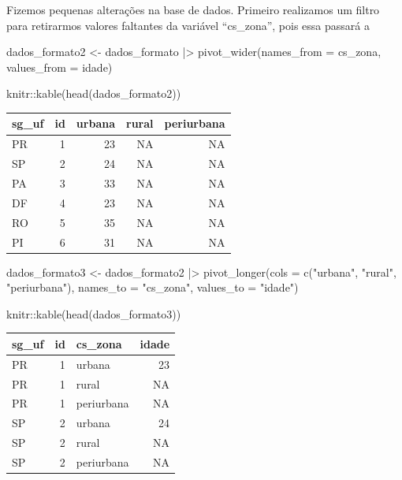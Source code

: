 \documentclass[
  letterpaper,
  DIV=11,
  numbers=noendperiod]{scrreprt}
\newenvironment{Shaded}{\begin{snugshade}}{\end{snugshade}}
\newcommand{\AttributeTok}[1]{\textcolor[rgb]{0.40,0.45,0.13}{#1}}
\newcommand{\FunctionTok}[1]{\textcolor[rgb]{0.28,0.35,0.67}{#1}}
\newcommand{\NormalTok}[1]{\textcolor[rgb]{0.00,0.23,0.31}{#1}}
\newcommand{\OtherTok}[1]{\textcolor[rgb]{0.00,0.23,0.31}{#1}}
\newcommand{\SpecialCharTok}[1]{\textcolor[rgb]{0.37,0.37,0.37}{#1}}
\newcommand{\StringTok}[1]{\textcolor[rgb]{0.13,0.47,0.30}{#1}}
\begin{document}
Fizemos pequenas alterações na base de dados. Primeiro realizamos um
filtro para retirarmos valores faltantes da variável ``cs\_zona'', pois
essa passará a

\begin{Shaded}
\begin{Highlighting}[]
\NormalTok{dados\_formato2 }\OtherTok{\textless{}{-}}\NormalTok{ dados\_formato }\SpecialCharTok{|\textgreater{}} 
  \FunctionTok{pivot\_wider}\NormalTok{(}\AttributeTok{names\_from =}\NormalTok{ cs\_zona, }\AttributeTok{values\_from =}\NormalTok{ idade)  }

\NormalTok{knitr}\SpecialCharTok{::}\FunctionTok{kable}\NormalTok{(}\FunctionTok{head}\NormalTok{(dados\_formato2))}
\end{Highlighting}
\end{Shaded}

\begin{longtable}[]{@{}lrrrr@{}}
\toprule()
sg\_uf & id & urbana & rural & periurbana \\
\midrule()
\endhead
PR & 1 & 23 & NA & NA \\
SP & 2 & 24 & NA & NA \\
PA & 3 & 33 & NA & NA \\
DF & 4 & 23 & NA & NA \\
RO & 5 & 35 & NA & NA \\
PI & 6 & 31 & NA & NA \\
\bottomrule()
\end{longtable}

\begin{Shaded}
\begin{Highlighting}[]
\NormalTok{dados\_formato3 }\OtherTok{\textless{}{-}}\NormalTok{ dados\_formato2 }\SpecialCharTok{|\textgreater{}} 
  \FunctionTok{pivot\_longer}\NormalTok{(}\AttributeTok{cols =} \FunctionTok{c}\NormalTok{(}\StringTok{"urbana"}\NormalTok{,   }\StringTok{"rural"}\NormalTok{,    }\StringTok{"periurbana"}\NormalTok{), }\AttributeTok{names\_to =} \StringTok{"cs\_zona"}\NormalTok{, }\AttributeTok{values\_to =} \StringTok{"idade"}\NormalTok{)}

\NormalTok{knitr}\SpecialCharTok{::}\FunctionTok{kable}\NormalTok{(}\FunctionTok{head}\NormalTok{(dados\_formato3))}
\end{Highlighting}
\end{Shaded}

\begin{longtable}[]{@{}lrlr@{}}
\toprule()
sg\_uf & id & cs\_zona & idade \\
\midrule()
\endhead
PR & 1 & urbana & 23 \\
PR & 1 & rural & NA \\
PR & 1 & periurbana & NA \\
SP & 2 & urbana & 24 \\
SP & 2 & rural & NA \\
SP & 2 & periurbana & NA \\
\bottomrule()
\end{longtable}
\end{document}
